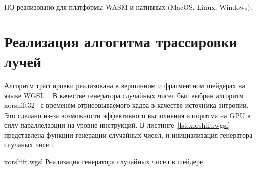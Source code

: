 ПО реализовано для платформы WASM и нативных (MacOS, Linux, Windows).

\section{Реализация алгогитма трассировки лучей}

Алгоритм трассировки реализована в 
вершинном и фрагментном шейдерах на языке WGSL~\cite{WebGPUSL}.
В качестве генератора случайных чисел был выбран алгоритм xorshift32~\cite{xorshift}
с временем отрисовываемого кадра в качестве источника энтропии. Это сделано
из-за возможности эффективного выполнения алгоритма на GPU в 
силу параллелазции на уровне инструкций. В листинге~\ref{lst:xorshift.wgsl} представлена 
функции генерации случайных чисел, и инициализация генератора случаных чисел.

    {xorshift.wgsl}
    {Реализация генератора случайных чисел в шейдере}
